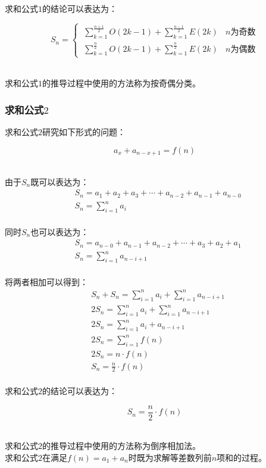 \documentclass[UTF8]{ctexart}
\begin{document}
    求和公式$1$的结论可以表达为：
    \begin{large}
        \begin{equation*}
            S_n=
            \begin{cases}
                ~\sum\limits_{k=1}^{\frac{n+1}{2}}O(2k-1)+\sum\limits_{k=1}^{\frac{n-1}{2}}E(2k)~~~~n\text{为奇数}\\[4mm]
                ~\sum\limits_{k=1}^{\frac{n}{2}}O(2k-1)+\sum\limits_{k=1}^{\frac{n}{2}}E(2k)~~~~n\text{为偶数}
            \end{cases}
        \end{equation*}
    \end{large}\\
    求和公式$1$的推导过程中使用的方法称为按奇偶分类。

\newpage

\subsubsection{求和公式$2$}
    \setcounter{equation}{0}
    求和公式$2$研究如下形式的问题：
    \begin{large}
        \begin{equation*}
            a_x+a_{n-x+1}=f(n)
        \end{equation*}
    \end{large}\\
    由于$S_n$既可以表达为：
    \begin{align}
        &S_n=a_1+a_2+a_3+\cdots+a_{n-2}+a_{n-1}+a_{n-0}\\[3mm]
        &S_n=\sum_{i=1}^na_i
    \end{align}\\
    同时$S_n$也可以表达为：
    \begin{align}
        &S_n=a_{n-0}+a_{n-1}+a_{n-2}+\cdots+a_{3}+a_{2}+a_{1}\\[3mm]
        &S_n=\sum_{i=1}^na_{n-i+1}
    \end{align}\\
    将两者相加可以得到：
    \begin{align}
        &S_n+S_n=\sum_{i=1}^na_i+\sum_{i=1}^na_{n-i+1}\\[5mm]
        &2S_n=\sum_{i=1}^na_i+\sum_{i=1}^na_{n-i+1}\\[5mm]
        &2S_n=\sum_{i=1}^na_i+a_{n-i+1}\\[5mm]
        &2S_n=\sum_{i=1}^n f(n)\\[5mm]
        &2S_n=n\cdot f(n)\\[5mm]
        &S_n=\frac{n}{2}\cdot f(n)
    \end{align}\\
    求和公式$2$的结论可以表达为：
    \begin{large}
        \begin{equation*}
            S_n=\frac{n}{2}\cdot f(n)
        \end{equation*}
    \end{large}\\
    求和公式$2$的推导过程中使用的方法称为倒序相加法。\\[3mm]
    求和公式$2$在满足$f(n)=a_1+a_n$时既为求解等差数列前$n$项和的过程。
\end{document}
